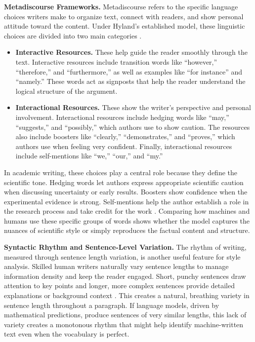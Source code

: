 \documentclass{article}
\begin{document}
\textbf{Metadiscourse Frameworks.} Metadiscourse refers to the specific language choices writers make to organize text, connect with readers, and show personal attitude toward the content. Under Hyland's established model, these linguistic choices are divided into two main categories \cite{ref2}.

\begin{itemize}
  \item \textbf{Interactive Resources.} These help guide the reader smoothly through the text. Interactive resources include transition words like ``however,'' ``therefore,'' and ``furthermore,'' as well as examples like ``for instance'' and ``namely.'' These words act as signposts that help the reader understand the logical structure of the argument.
  \item \textbf{Interactional Resources.} These show the writer's perspective and personal involvement. Interactional resources include hedging words like ``may,'' ``suggests,'' and ``possibly,'' which authors use to show caution. The resources also include boosters like ``clearly,'' ``demonstrates,'' and ``proves,'' which authors use when feeling very confident. Finally, interactional resources include self-mentions like ``we,'' ``our,'' and ``my.''
\end{itemize}

In academic writing, these choices play a central role because they define the scientific tone. Hedging words let authors express appropriate scientific caution when discussing uncertainty or early results. Boosters show confidence when the experimental evidence is strong. Self-mentions help the author establish a role in the research process and take credit for the work \cite{ref2}. Comparing how machines and humans use these specific groups of words shows whether the model captures the nuances of scientific style or simply reproduces the factual content and structure.

\textbf{Syntactic Rhythm and Sentence-Level Variation.} The rhythm of writing, measured through sentence length variation, is another useful feature for style analysis. Skilled human writers naturally vary sentence lengths to manage information density and keep the reader engaged. Short, punchy sentences draw attention to key points and longer, more complex sentences provide detailed explanations or background context \cite{ref12}. This creates a natural, breathing variety in sentence length throughout a paragraph. If language models, driven by mathematical predictions, produce sentences of very similar lengths, this lack of variety creates a monotonous rhythm that might help identify machine-written text even when the vocabulary is perfect.
\end{document}
